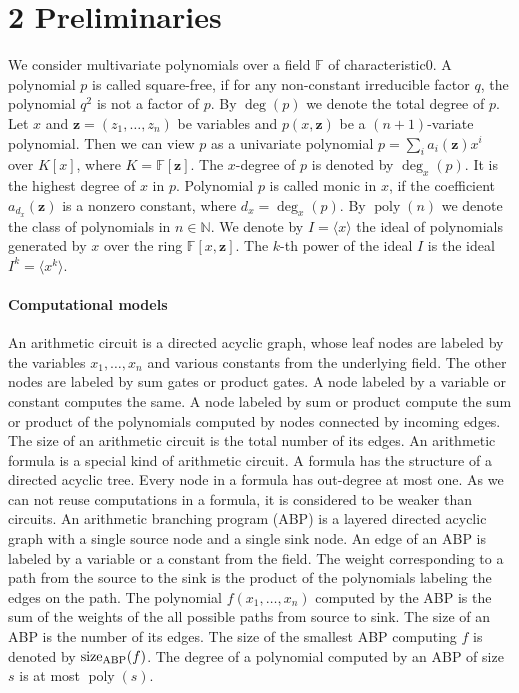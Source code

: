 \documentclass[10pt,a4paper]{article}
\newcommand{\sz}{\operatorname{size}_{\rm ABP}}
\begin{document}
\section*{2 Preliminaries}
We consider multivariate polynomials over a field $\mathbb F$ of characteristic0. A polynomial $p$ is called square-free, if for any non-constant irreducible factor $q$, the polynomial $q^2$ is not a factor of $p$.
By $\deg(p)$ we denote the total degree of $p$. Let $x$ and $\mathbf z=(z_1,\ldots,z_n)$ be variables and $p(x,\mathbf z)$ be a $(n+1)$-variate polynomial. Then we can view $p$ as a univariate polynomial $p=\sum_i a_i(\mathbf z)x^i$ over $K[x]$, where $K=\mathbb F[\mathbf z]$. The $x$-degree of $p$ is denoted by $\deg_x(p)$. It is the highest degree of $x$ in $p$. Polynomial $p$ is called monic in $x$, if the coefficient $a_{d_x}(\mathbf z)$ is a nonzero constant, where $d_x=\deg_x(p)$.
By $\operatorname{poly}(n)$ we denote the class of polynomials in $n\in\mathbb N$. We denote by $I=\langle x\rangle$ the ideal of polynomials generated by $x$ over the ring $\mathbb F[x,\mathbf z]$. The $k$-th power of the ideal $I$ is the ideal $I^k=\langle x^k\rangle$.
\paragraph{Computational models}
An arithmetic circuit is a directed acyclic graph, whose leaf nodes are labeled by the variables $x_1,\ldots,x_n$ and various constants from the underlying field. The other nodes are labeled by sum gates or product gates. A node labeled by a variable or constant computes the same. A node labeled by sum or product compute the sum or product of the polynomials computed by nodes connected by incoming edges. The size of an arithmetic circuit is the total number of its edges.
An arithmetic formula is a special kind of arithmetic circuit. A formula has the structure of a directed acyclic tree. Every node in a formula has out-degree at most one. As we can not reuse computations in a formula, it is considered to be weaker than circuits.
An arithmetic branching program (ABP) is a layered directed acyclic graph with a single source node and a single sink node. An edge of an ABP is labeled by a variable or a constant from the field. The weight corresponding to a path from the source to the sink is the product of the polynomials labeling the edges on the path. The polynomial $f(x_1,\ldots,x_n)$ computed by the ABP is the sum of the weights of the all possible paths from source to sink.
The size of an ABP is the number of its edges. The size of the smallest ABP computing $f$ is denoted by $\sz(f)$. The degree of a polynomial computed by an ABP of size $s$ is at most $\operatorname{poly}(s)$.
\end{document}
